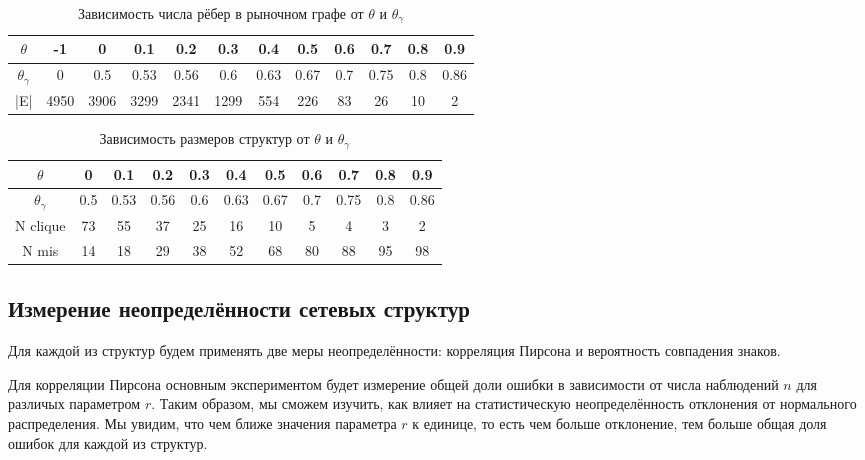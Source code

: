 \begin{table}[h!]
\centering
\begin{tabular}{ |c|c|c|c|c|c|c|c|c|c|c|c| } 
 \hline
 $\theta$ & -1 & 0 & 0.1 & 0.2 & 0.3 & 0.4 & 0.5 & 0.6 & 0.7 & 0.8 & 0.9 \\ 
 \hline
  $\theta_\gamma$ & 0 & 0.5 & 0.53 & 0.56 & 0.6 & 0.63 & 0.67 & 0.7 & 0.75 & 0.8 & 0.86 \\ 
 \hline
 |E|	  & 4950 & 3906 & 3299 & 2341 & 1299 & 554 & 226 & 83 & 26 & 10 & 2 \\ 
 \hline
\end{tabular}
\caption{Зависимость числа рёбер в рыночном графе от $\theta$ и $\theta_\gamma$}
\label{table:mg_size_sign}
\end{table}


\begin{table}[h!]
\centering
\begin{tabular}{ |c|c|c|c|c|c|c|c|c|c|c| } 
 \hline
 $\theta$ & 0 & 0.1 & 0.2 & 0.3 & 0.4 & 0.5 & 0.6 & 0.7 & 0.8 & 0.9 \\ 
 \hline
  $\theta_\gamma$ & 0.5 & 0.53 & 0.56 & 0.6 & 0.63 & 0.67 & 0.7 & 0.75 & 0.8 & 0.86 \\ 
 \hline
 N clique & 73 & 55 & 37 & 25 & 16 & 10 & 5 & 4 & 3 & 2\\ 
 \hline
 N mis & 14  & 18 & 29 & 38 & 52 & 68 & 80 & 88 & 95 & 98\\ 
 \hline
\end{tabular}
\caption{Зависимость размеров структур от $\theta$ и $\theta_\gamma$}
\label{table:mis_clique_size_sign}
\end{table}



\subsection{Измерение неопределённости сетевых структур}

Для каждой из структур будем применять две меры неопределённости: корреляция Пирсона и вероятность совпадения знаков.

Для корреляции Пирсона основным экспериментом будет измерение общей доли  ошибки в зависимости от числа наблюдений $n$ для различых параметром $r$. Таким образом, мы сможем изучить, как влияет на статистическую неопределённость отклонения от нормального распределения. Мы увидим, что чем ближе значения параметра $r$ к единице, то есть чем больше отклонение, тем больше общая доля ошибок для каждой из структур.

